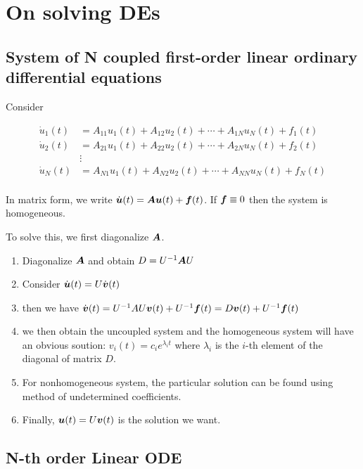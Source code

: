 \documentclass{article}
\begin{document}
\section{On solving DEs}

\subsection{System of N coupled first-order linear ordinary differential equations}

Consider

\begin{equation*}
    \begin{split}
        \dot u_1(t) &= A_{11} u_1(t) + A_{12} u_2(t) + \cdots+ A_{1N} u_N(t) + f_1(t)\\
        \dot u_2(t) &= A_{21} u_1(t) + A_{22} u_2(t) + \cdots+ A_{2N} u_N(t) + f_2(t)\\
         & \vdots\\
        \dot u_N(t) &= A_{N1} u_1(t) + A_{N2} u_2(t) + \cdots+ A_{NN} u_N(t) + f_N(t)\\
    \end{split}
\end{equation*}

In matrix form, we write \(\dot {\boldsymbol{u}}(t) = \boldsymbol{A} \boldsymbol{u}(t)+\boldsymbol{f}(t)\). If \(\boldsymbol{f}\equiv 0\) then the system is homogeneous.

To solve this, we first diagonalize \(\boldsymbol{A}\).

\begin{enumerate}
    \item Diagonalize \(\boldsymbol{A}\) and obtain \(D = U^{-1}\boldsymbol{A} U\)
    \item Consider \(\dot {\boldsymbol{u}}(t) = U \dot {\boldsymbol{v}}(t)\)
    \item then we have \(\dot{\boldsymbol{v}}(t) = U^{-1}AU\boldsymbol{v}(t) + U^{-1}\boldsymbol{f}(t)=D\boldsymbol{v}(t)+U^{-1}\boldsymbol{f}(t)\)
    \item we then obtain the uncoupled system and the homogeneous system will have an obvious soution: \(v_i (t)= c_i e^{\lambda_i t}\) where \(\lambda_i\) is the \(i\)-th element of the diagonal of matrix \(D\).
    \item For nonhomogeneous system, the particular solution can be found using method of undetermined coefficients.
    \item Finally, \(\boldsymbol{u}(t) = U\boldsymbol{v}(t)\) is the solution we want.
    
\end{enumerate}

\subsection{N-th order Linear ODE}
\end{document}
